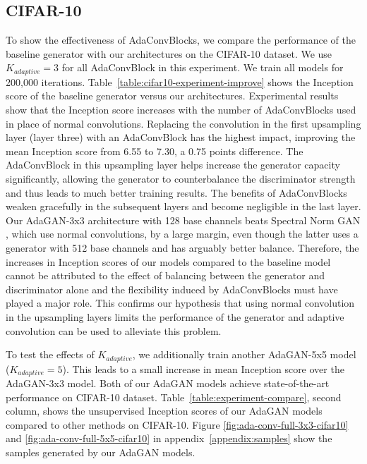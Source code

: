\documentclass{article} %
\begin{document}
\subsection{CIFAR-10}
To show the effectiveness of AdaConvBlocks, we compare the performance of the baseline generator with our architectures on the CIFAR-10 dataset. We use $K_{adaptive}=3$ for all AdaConvBlock in this experiment. We train all models for 200,000 iterations. Table~\ref{table:cifar10-experiment-improve} shows the Inception score of the baseline generator versus our architectures. Experimental results show that the Inception score increases with the number of AdaConvBlocks used in place of normal convolutions. Replacing the convolution in the first upsampling layer (layer three) with an AdaConvBlock has the highest impact, improving the mean Inception score from 6.55 to 7.30, a 0.75 points difference. The AdaConvBlock in this upsampling layer helps increase the generator capacity significantly, allowing the generator to counterbalance the discriminator strength and thus leads to much better training results. The benefits of AdaConvBlocks weaken gracefully in the subsequent layers and become negligible in the last layer. Our AdaGAN-3x3 architecture with 128 base channels beats Spectral Norm GAN \citep{miyato2017spectral}, which use normal convolutions, by a large margin, even though the latter uses a generator with 512 base channels and has arguably better balance. Therefore, the increases in Inception scores of our models compared to the baseline model cannot be attributed to the effect of balancing between the generator and discriminator alone and the flexibility induced by AdaConvBlocks must have played a major role. This confirms our hypothesis that using normal convolution in the upsampling layers limits the performance of the generator and adaptive convolution can be used to alleviate this problem. \par
To test the effects of $K_{adaptive}$, we additionally train another AdaGAN-5x5 model ($K_{adaptive}=5$). This leads to a small increase in mean Inception score over the AdaGAN-3x3 model. Both of our AdaGAN models achieve state-of-the-art performance on CIFAR-10 dataset. Table~\ref{table:experiment-compare}, second column, shows the unsupervised Inception scores of our AdaGAN models compared to other methods on CIFAR-10. Figure \ref{fig:ada-conv-full-3x3-cifar10} and \ref{fig:ada-conv-full-5x5-cifar10} in appendix~\ref{appendix:samples} show the samples generated by our AdaGAN models.
\end{document}
